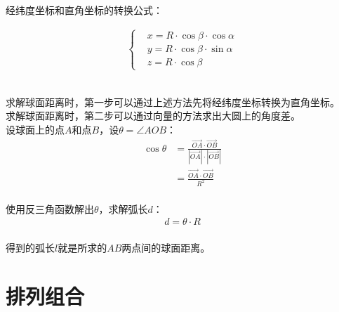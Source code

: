 \documentclass[UTF8]{ctexart}
\begin{document}
    经纬度坐标和直角坐标的转换公式：\vspace{5pt}
    \begin{large}
        \begin{align*}
            \begin{cases}
                &x=R\cdot\cos{\beta}\cdot\cos{\alpha}\\[2mm]
                &y=R\cdot\cos{\beta}\cdot\sin{\alpha}\\[2mm]
                &z=R\cdot\cos{\beta}
            \end{cases}
        \end{align*}
    \end{large}\\
    求解球面距离时，第一步可以通过上述方法先将经纬度坐标转换为直角坐标。\\[3mm]
    求解球面距离时，第二步可以通过向量的方法求出大圆上的角度差。\\[5mm]
    设球面上的点$A$和点$B$，设$\theta=\angle AOB$：\vspace{3pt}
    \begin{align}
        \cos{\theta}
        &=\frac{\overrightarrow{OA}\cdot\overrightarrow{OB}}{|\overrightarrow{OA}|\cdot|\overrightarrow{OB}|}\\[4mm]
        &=\frac{\overrightarrow{OA}\cdot\overrightarrow{OB}}{R^2}
    \end{align}\\
    使用反三角函数解出$\theta$，求解弧长$d$：
    \begin{align}
        d=\theta\cdot R
    \end{align}\\
    得到的弧长$l$就是所求的$AB$两点间的球面距离。

\newpage

\section{排列组合}
\end{document}
